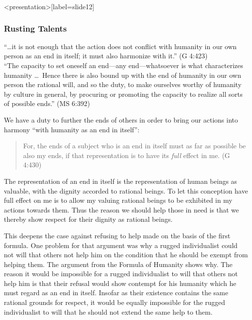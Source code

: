 \begin{frame}<presentation>[label=slide12]
    \frametitle{Rusting Talents}
        ``\ldots it is not enough that the action does not conflict with humanity in our own person as an end in itself; it must also harmonize with it.'' (G 4:423) \\
        ``The capacity to set oneself an end---any end---whatsoever is what characterizes humanity \ldots\ Hence there is also bound up with the end of humanity in our own person the rational will, and so the duty, to make ourselves worthy of humanity by culture in general, by procuring or promoting the capacity to realize all sorts of possible ends.'' (MS 6:392)
\end{frame}

We have a duty to further the ends of others in order to bring our actions into harmony ``with humanity as an end in itself'':
\begin{quote}
	For, the ends of a subject who is an end in itself must as far as possible be also my ends, if that representation is to have its \emph{full} effect in me. (G 4:430)
\end{quote}

The representation of an end in itself is the representation of human beings as valuable, with the dignity accorded to rational beings. To let this conception have full effect on me is to allow my valuing rational beings to be exhibited in my actions towards them. Thus the reason we should help those in need is that we thereby show respect for their dignity as rational beings.

This deepens the case against refusing to help made on the basis of the first formula. One problem for that argument was why a rugged individualist could not will that others not help him on the condition that he should be exempt from helping them. The argument from the Formula of Humanity shows why. The reason it would be impossible for a rugged individualist to will that others not help him is that their refusal would show contempt for his humanity which he must regard as an end in itself. Insofar as their existence contains the same rational grounds for respect, it would be equally impossible for the rugged individualist to will that he should not extend the same help to them. \change

